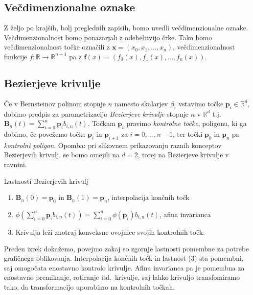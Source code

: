 \documentclass[isrm2, tisk]{fmfdelo}
\newcommand{\R}{\mathbb R}
\newcommand{\p}{\textbf{p}}
\newcommand{\lilb}[2]{b_{#1,#2}(t)}
\newcommand{\bigbb}[1]{\textbf{B}_{#1}(t)}
\newcommand{\bigbbod}[2]{\textbf{B}_{#1}(#2)}
\newcommand{\bernsteinsump}[2]{\sum_{#1=0}^{#2} \p_{#1}\lilb{#1}{#2}}
\newcommand{\bernsteinsumtritri}[3]{\sum_{#1=0}^{#2} #3\lilb{#1}{#2}}
\begin{document}
    \subsection{Večdimenzionalne oznake}
    Z željo po krajših, bolj preglednih zapisih, bomo uvedli večdimenzionalne oznake.
    Večdimenzionalnost bomo ponazarjali z odebelitvijo črke.
    Tako bomo večdimenzionalnost točke označili z $\mathbf{x}=(x_0,x_1,\dots,x_n)$, večdimenzionalnost funkcije $f:\R\to\R^{n+1}$ pa z $\mathbf{f}(x)=\left( f_0(x),f_1(x),\dots,f_n(x) \right)$.

    \subsection{Bezierjeve krivulje}
    Če v Bernsteinov polinom stopnje $n$ namesto skalarjev $\beta_i$ vstavimo točke $\p_i\in\R^d$, dobimo predpis za parametrizacijo \textit{Bezierjeve krivulje} stopnje $n$ v $\R^d$ t.j.\ $\bigbb{n}=\bernsteinsump{i}{n}$.
    Točkam $\p_i$ pravimo \textit{kontrolne točke}, poligonu, ki ga dobimo, če povežemo točke $\p_i$ in $\p_{i+1}$ za $i=0,\dots,n-1$, ter točki $\p_0$ in $\p_n$ pa \textit{kontrolni poligon}.
    Opomba: pri slikovnem prikazovanju raznih konceptov Bezierjevih krivulj, se bomo omejili na $d=2$, torej na Bezierjeve krivulje v ravnini.

    \begin{izrek}{Lastnosti Bezierjevih krivulj}
        \label{izrek:lastnosti-bezierjevih-krivulj}
        \begin{enumerate}
            \item $\bigbbod{n}{0}=\p_0$ in $\bigbbod{n}{1}=\p_n$, interpolacija končnih točk
            \item $\phi(\bernsteinsump{i}{n}) =\bernsteinsumtritri{i}{n}{\phi(\p_i)}$, afina invarianca
            \item Krivulja leži znotraj konveksne ovojnice svojih kontrolnih točk.
        \end{enumerate}
    \end{izrek}
    Preden izrek dokažemo, povejmo zakaj so zgornje lastnosti pomembne za potrebe grafičnega oblikovanja.
    Interpolacija končnih točk in lastnost (3) sta pomembni, saj omogočata enostavno kontrolo krivulje.
    Afina invarianca pa je pomembna za enostavno premikanje, rotiranje itd.\ krivulje, saj lahko krivuljo transfomiramo tako, da transformacijo uporabimo na kontrolnih točkah.
\end{document}
